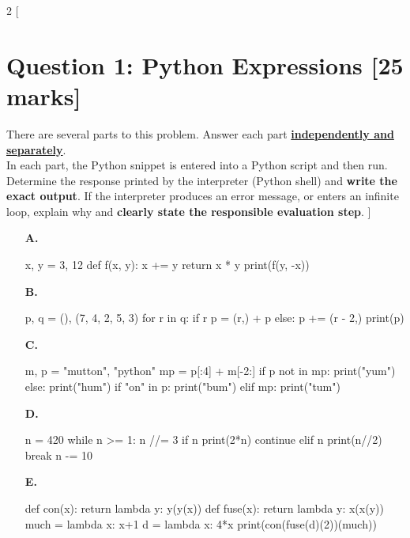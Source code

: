 \begin{multicols*}{2}
[
\section{Question 1: Python Expressions [25 marks]}
There are several parts to this problem. Answer each part \underline{\textbf{independently and separately}}. \\
In each part, the Python snippet is entered into a Python script and then run. Determine the
response printed by the interpreter (Python shell) and \textbf{write the exact output}. 
If the interpreter produces an error message, or enters an infinite loop, explain why and
\textbf{clearly state the responsible evaluation step}.
]
\begin{enumerate}
\item[\textbf{A.}] 
\begin{python}
x, y = 3, 12
def f(x, y):
    x += y
    return x * y
print(f(y, -x))
\end{python}
\begin{flushright}
    [5 marks]
\end{flushright}

\item[\textbf{B.}]
\begin{python}
p, q = (), (7, 4, 2, 5, 3)
for r in q:
    if r %
        p = (r,) + p
    else:
        p += (r - 2,)
print(p)
\end{python}
\begin{flushright}
    [5 marks]
\end{flushright}

\item[\textbf{C.}]
\begin{python}
m, p = "mutton", "python"
mp = p[:4] + m[-2:]
if p not in mp:
    print("yum")
else:
    print("hum")
if "on" in p:
    print("bum")
elif mp:
    print("tum")
\end{python}
\begin{flushright}
    [5 marks]
\end{flushright}

\hspace{2 cm}

\item[\textbf{D.}]
\begin{python}
n = 420
while n >= 1:
    n //= 3
    if n %
        print(2*n)
        continue
    elif n %
        print(n//2)
        break
    n -= 10
\end{python}
\begin{flushright}
    [5 marks]
\end{flushright}

\item[\textbf{E.}]
\begin{python}
def con(x):
    return lambda y: y(y(x))
def fuse(x):
    return lambda y: x(x(y))
much = lambda x: x+1
d = lambda x: 4*x
print(con(fuse(d)(2))(much))
\end{python}
\begin{flushright}
    [5 marks]
\end{flushright}
\end{enumerate}
\end{multicols*}

